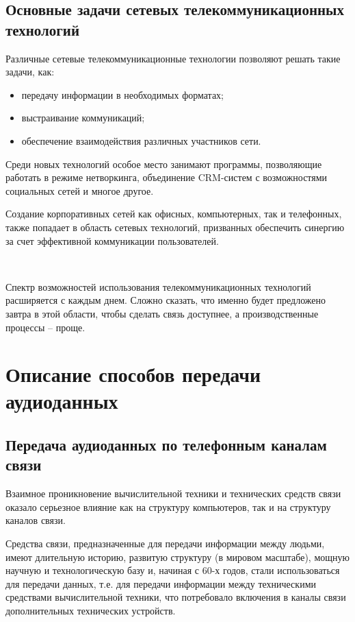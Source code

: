 \documentclass[a4paper]{report}
\begin{document}
\subsection{Основные задачи сетевых телекоммуникационных технологий}
Различные сетевые телекоммуникационные технологии позволяют решать такие задачи, как:
\begin{itemize}
\item передачу информации в необходимых форматах;
\item выстраивание коммуникаций;
\item обеспечение взаимодействия различных участников сети.
\end{itemize}

Среди новых технологий особое место занимают программы, позволяющие работать в режиме нетворкинга, объединение CRM-систем с возможностями социальных сетей и многое другое.

Создание корпоративных сетей как офисных, компьютерных, так и телефонных, также попадает в область сетевых технологий, призванных обеспечить синергию за счет эффективной коммуникации пользователей.

~

Спектр возможностей использования телекоммуникационных технологий расширяется с каждым днем. Сложно сказать, что именно будет предложено завтра в этой области, чтобы сделать связь доступнее, а производственные процессы – проще.

\section{Описание способов передачи аудиоданных}
\subsection{Передача аудиоданных по телефонным каналам связи}

Взаимное проникновение вычислительной техники и технических средств связи оказало серьезное влияние как на структуру компьютеров, так и на структуру каналов связи.

Средства связи, предназначенные для передачи информации между людьми, имеют длительную историю, развитую структуру (в мировом масштабе), мощную научную и технологическую базу и, начиная с 60-х годов, стали использоваться для передачи данных, т.е. для передачи информации между техническими средствами вычислительной техники, что потребовало включения в каналы связи дополнительных технических устройств.
\end{document}
